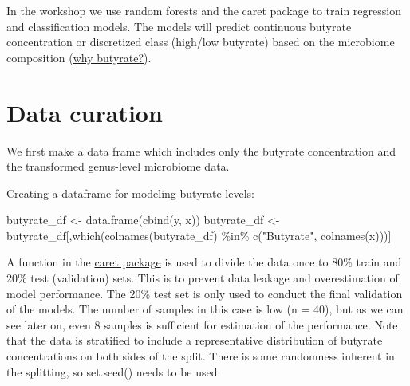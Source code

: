 \documentclass[
  oneside]{book}
\newenvironment{Shaded}{\begin{snugshade}}{\end{snugshade}}
\newcommand{\AttributeTok}[1]{\textcolor[rgb]{0.77,0.63,0.00}{#1}}
\newcommand{\ConstantTok}[1]{\textcolor[rgb]{0.00,0.00,0.00}{#1}}
\newcommand{\DecValTok}[1]{\textcolor[rgb]{0.00,0.00,0.81}{#1}}
\newcommand{\FunctionTok}[1]{\textcolor[rgb]{0.00,0.00,0.00}{#1}}
\newcommand{\NormalTok}[1]{#1}
\newcommand{\OtherTok}[1]{\textcolor[rgb]{0.56,0.35,0.01}{#1}}
\newcommand{\SpecialCharTok}[1]{\textcolor[rgb]{0.00,0.00,0.00}{#1}}
\newcommand{\StringTok}[1]{\textcolor[rgb]{0.31,0.60,0.02}{#1}}
\begin{document}
In the workshop we use random forests and the caret package to train regression and
classification models. The models will predict continuous butyrate concentration or discretized
class (high/low butyrate) based on the microbiome composition (\href{https://scholar.google.com/scholar?as_sdt=0\%2C5\&as_ylo=2015\&q=butyrate+and+gut+microbiome\&btnG=}{why butyrate?}).

\hypertarget{data-curation}{%
\section{Data curation}\label{data-curation}}

We first make a data frame which includes only the butyrate concentration and the
transformed genus-level microbiome data.

Creating a dataframe for modeling butyrate levels:

\begin{Shaded}
\begin{Highlighting}[]
\NormalTok{butyrate\_df }\OtherTok{\textless{}{-}} \FunctionTok{data.frame}\NormalTok{(}\FunctionTok{cbind}\NormalTok{(y, x))}
\NormalTok{butyrate\_df }\OtherTok{\textless{}{-}}\NormalTok{ butyrate\_df[,}\FunctionTok{which}\NormalTok{(}\FunctionTok{colnames}\NormalTok{(butyrate\_df) }\SpecialCharTok{\%in\%} \FunctionTok{c}\NormalTok{(}\StringTok{"Butyrate"}\NormalTok{, }\FunctionTok{colnames}\NormalTok{(x)))]}
\end{Highlighting}
\end{Shaded}

A function in the \href{https://topepo.github.io/caret/}{caret package} is used to divide the data once to 80\% train and 20\% test (validation)
sets. This is to prevent data leakage and overestimation of model performance. The
20\% test set is only used to conduct the final validation of the models. The number of
samples in this case is low (n = 40), but as we can see later on, even 8 samples is
sufficient for estimation of the performance. Note that the data is stratified to include
a representative distribution of butyrate concentrations on both sides of the split.
There is some randomness inherent in the splitting, so set.seed() needs to be used.

\begin{Shaded}
\end{Shaded}
\end{document}
